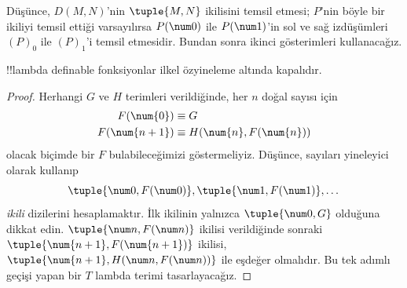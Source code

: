 Düşünce, $D(M,N)$'nin $\tuple{M,N}$ ikilisini temsil etmesi; $P$'nin böyle
bir ikiliyi temsil ettiği varsayılırsa $P(\num 0)$ ile $P(\num 1)$'in sol ve
sağ izdüşümleri $(P)_0$ ile $(P)_1$'i temsil etmesidir. Bundan sonra ikinci
gösterimleri kullanacağız.

\begin{lem}
!!{lambda definable} fonksiyonlar ilkel özyineleme altında kapalıdır.
\end{lem}

\begin{proof}
Herhangi $G$ ve $H$ terimleri verildiğinde, her $n$ doğal sayısı için
\begin{align*}
F(\num{0}) & \equiv G \\
F(\num{n+1}) & \equiv H(\num{n}, F(\num{n}))
\end{align*}
olacak biçimde bir $F$ bulabileceğimizi göstermeliyiz. Düşünce, sayıları
yineleyici olarak kullanıp
\[
\tuple{\num 0, F(\num 0)}, \tuple{\num 1, F(\num 1)}, \dots
\]
\emph{ikili} dizilerini hesaplamaktır. İlk ikilinin yalnızca
$\tuple{\num 0,G}$ olduğuna dikkat edin. $\tuple{\num n,F(\num n)}$ ikilisi
verildiğinde sonraki $\tuple{\num{n+1},F(\num{n+1})}$ ikilisi,
$\tuple{\num{n+1},H(\num n,F(\num n))}$ ile eşdeğer olmalıdır. Bu tek adımlı
geçişi yapan bir $T$ lambda terimi tasarlayacağız.


\end{proof}
